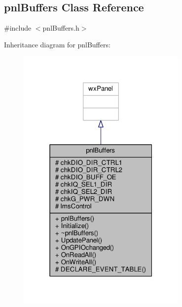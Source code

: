 \subsection{pnl\+Buffers Class Reference}
\label{classpnlBuffers}


{\ttfamily \#include $<$pnl\+Buffers.\+h$>$}



Inheritance diagram for pnl\+Buffers\+:
\nopagebreak
\begin{figure}[H]
\begin{center}
\leavevmode
\includegraphics[width=235pt]{de/d4d/classpnlBuffers__inherit__graph}
\end{center}
\end{figure}


